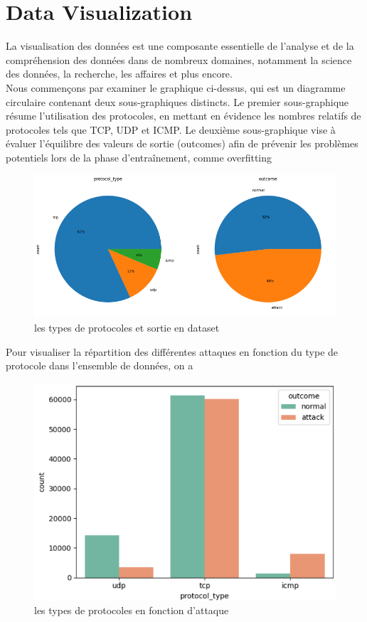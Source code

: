 \documentclass[a4paper,12pt]{report}
\begin{document}
\section {Data Visualization}
\noindent\normalsize La visualisation des données\cite{scikit-learn-visualization} est une composante essentielle de l'analyse et de la compréhension des données dans de nombreux domaines, notamment la science des données, la recherche, les affaires et plus encore.\\[0.5cm]
\noindent\normalsize Nous commençons par examiner le graphique ci-dessus, qui est un diagramme circulaire contenant deux sous-graphiques distincts. Le premier sous-graphique résume l'utilisation des protocoles, en mettant en évidence les nombres relatifs de protocoles tels que TCP, UDP et ICMP. Le deuxième sous-graphique vise à évaluer l'équilibre des valeurs de sortie (outcomes) afin de prévenir les problèmes potentiels lors de la phase d'entraînement, comme overfitting
\begin{figure}[H]
\centering
 \includegraphics[scale=0.9]{outils-images/graphs/g2.png}
\caption{les types de protocoles et sortie en dataset}
\end{figure}
\noindent\normalsize Pour visualiser la répartition des différentes attaques en fonction du type de protocole dans l'ensemble de données, on a
\begin{figure}[H]
\centering
 \includegraphics[scale=0.9]{outils-images/graphs/g3.png}
\caption{les types de protocoles en fonction d'attaque}
\end{figure}
\end{document}
